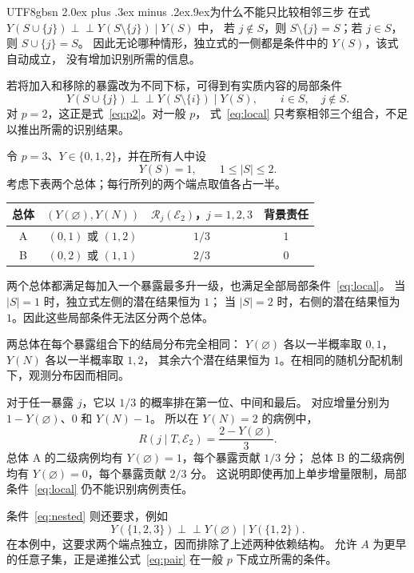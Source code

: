 \documentclass[11pt,a4paper]{article}
\makeatletter
\newcommand{\headingweight}{\ifPDFTeX\mdseries\else\bfseries\fi}
\renewcommand{\section}{\@startsection{section}{1}{0pt}
  {2.0ex plus .3ex minus .2ex}{.9ex}{\normalfont\large\headingweight}}
\newcommand{\indep}{\mathrel{\perp\!\!\!\perp}}
\makeatother
\begin{document}
\begin{CJK*}{UTF8}{gbsn}
\clearpage
\section{为什么不能只比较相邻三步}
在式 $Y(S\cup\{j\})\indep Y(S\setminus\{j\})\mid Y(S)$ 中，
若 $j\notin S$，则 $S\setminus\{j\}=S$；若 $j\in S$，则 $S\cup\{j\}=S$。
因此无论哪种情形，独立式的一侧都是条件中的 $Y(S)$，该式自动成立，
没有增加识别所需的信息。

若将加入和移除的暴露改为不同下标，可得到有实质内容的局部条件
\begin{equation}
Y(S\cup\{j\})\indep Y(S\setminus\{i\})\mid Y(S),
\qquad i\in S,\quad j\notin S.
\label{eq:local}
\end{equation}
对 $p=2$，这正是式~\eqref{eq:p2}。对一般 $p$，
式~\eqref{eq:local} 只考察相邻三个组合，不足以推出所需的识别结果。

\medskip
\noindent{\headingweight 三个暴露的反例。}
令 $p=3$、$Y\in\{0,1,2\}$，并在所有人中设
\[
Y(S)=1,\qquad 1\le |S|\le2.
\]
考虑下表两个总体；每行所列的两个端点取值各占一半。
\begin{center}
\renewcommand{\arraystretch}{1.35}
\setlength{\tabcolsep}{7pt}
\begin{tabular}{@{}c c c c@{}}
\toprule
总体 & $(Y(\varnothing),Y(N))$ & $\mathcal R_j(\mathcal E_2)$，$j=1,2,3$
 & 背景责任\\
\midrule
A & $(0,1)$ 或 $(1,2)$ & $1/3$ & $1$\\
B & $(0,2)$ 或 $(1,1)$ & $2/3$ & $0$\\
\bottomrule
\end{tabular}
\end{center}

两个总体都满足每加入一个暴露最多升一级，也满足全部局部条件~\eqref{eq:local}。
当 $|S|=1$ 时，独立式左侧的潜在结果恒为 $1$；
当 $|S|=2$ 时，右侧的潜在结果恒为 $1$。因此这些局部条件无法区分两个总体。

两总体在每个暴露组合下的结局分布完全相同：
$Y(\varnothing)$ 各以一半概率取 $0,1$，$Y(N)$ 各以一半概率取 $1,2$，
其余六个潜在结果恒为 $1$。在相同的随机分配机制下，观测分布因而相同。

对于任一暴露 $j$，它以 $1/3$ 的概率排在第一位、中间和最后。
对应增量分别为 $1-Y(\varnothing)$、$0$ 和 $Y(N)-1$。
所以在 $Y(N)=2$ 的病例中，
\[
R(j\mid T,\mathcal E_2)=\frac{2-Y(\varnothing)}{3}.
\]
总体 A 的二级病例均有 $Y(\varnothing)=1$，每个暴露贡献 $1/3$ 分；
总体 B 的二级病例均有 $Y(\varnothing)=0$，每个暴露贡献 $2/3$ 分。
这说明即使再加上单步增量限制，局部条件~\eqref{eq:local} 仍不能识别病例责任。

条件~\eqref{eq:nested} 则还要求，例如
\[
Y(\{1,2,3\})\indep Y(\varnothing)\mid Y(\{1,2\}).
\]
在本例中，这要求两个端点独立，因而排除了上述两种依赖结构。
允许 $A$ 为更早的任意子集，正是递推公式~\eqref{eq:pair} 在一般 $p$ 下成立所需的条件。

\ifPDFTeX\end{CJK*}\fi
\end{document}
